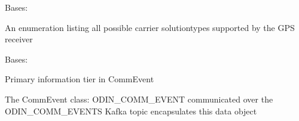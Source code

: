 \documentclass[letterpaper,10pt,english]{sphinxmanual}
\begin{document}
\begin{fulllineitems}
\label{\detokenize{Raven:Raven.CarrierSolutionType}}
\sphinxAtStartPar
Bases: 

\sphinxAtStartPar
An enumeration listing all possible carrier solution\sphinxhyphen{}types supported by the GPS receiver

\begin{fulllineitems}
\label{\detokenize{Raven:Raven.CarrierSolutionType.FIXED_SOLUTION}}
\end{fulllineitems}


\begin{fulllineitems}
\label{\detokenize{Raven:Raven.CarrierSolutionType.FLOAT_SOLUTION}}
\end{fulllineitems}


\begin{fulllineitems}
\label{\detokenize{Raven:Raven.CarrierSolutionType.NO_SOLUTION}}
\end{fulllineitems}


\end{fulllineitems}


\begin{fulllineitems}
\label{\detokenize{Raven:Raven.CommEvent}}
\sphinxAtStartPar
Bases: 

\sphinxAtStartPar
Primary information tier in CommEvent

\sphinxAtStartPar
The CommEvent class: ODIN\_COMM\_EVENT communicated over the ODIN\_COMM\_EVENTS Kafka topic encapsulates this
data object

\end{fulllineitems}
\end{document}
